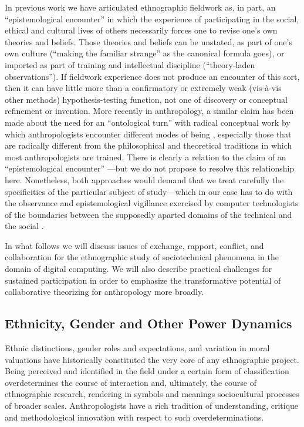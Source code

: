 \documentclass[10pt,letter,oneside]{scrartcl}
\begin{document}
In previous work we have articulated ethnographic fieldwork as, in
part, an ``epistemological encounter'' \cite{Kelty2008} in which the
experience of participating in the social, ethical and cultural lives
of others necessarily forces one to revise one's own theories and
beliefs.  Those theories and beliefs can be unstated, as part of one's
own culture (``making the familiar strange'' as the canonical formula
goes), or imported as part of training and intellectual discipline
(``theory-laden observations'').  If fieldwork experience does not
produce an encounter of this sort, then it can have little more than a
confirmatory or extremely weak (vis-à-vis other methods)
hypothesis-testing function, not one of discovery or conceptual
refinement or invention.  More recently in anthropology, a similar
claim has been made about the need for an ``ontological turn'' with
radical conceptual work by which anthropologists encounter different
modes of being \cite{Viveiros2002,Lima2007,Kohn2013,Henare2007}, 
especially those that are radically different from the philosophical and theoretical
traditions in which most anthropologists are trained.  There is
clearly a relation to the claim of an ``epistemological encounter''
---but we do not propose to resolve this relationship here.
Nonetheless, both approaches would demand that we treat carefully the
specificities of the particular subject of study---which in our case
has to do with the observance and epistemological vigillance exercised
by computer technologists of the boundaries between the supposedly 
aparted domains of the technical and  the social \cite{Pfaffenberger1992}.

In what follows we will discuss issues of exchange, rapport, conflict,
and collaboration for the ethnographic study of sociotechnical
phenomena in the domain of digital computing. We will also describe
practical challenges for sustained participation in order to emphasize
the transformative potential of collaborative theorizing for
anthropology more broadly.

\subsection*{Ethnicity, Gender and Other Power Dynamics}

Ethnic distinctions, gender roles and expectations, and variation in
moral valuations have historically constituted the very core of any 
ethnographic project. Being perceived and identified in the field under 
a certain form of classification overdetermines the course of interaction 
and, ultimately, the course of ethnographic research, rendering in symbols 
and meanings sociocultural processes of broader scales. Anthropologists 
have a rich tradition of understanding, critique and methodological 
innovation with respect to such overdeterminations. 
\end{document}
